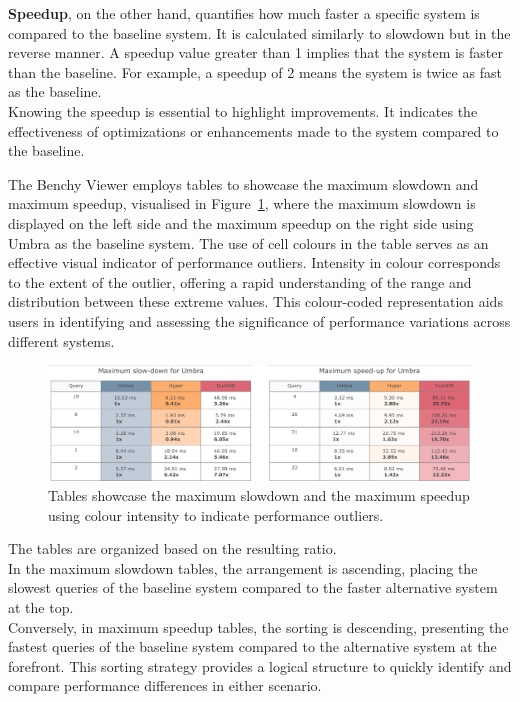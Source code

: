 \textbf{Speedup}, on the other hand, quantifies how much faster a specific system is compared to the baseline system. It is calculated similarly to slowdown but in the reverse manner. A speedup value greater than 1 implies that the system is faster than the baseline. For example, a speedup of 2 means the system is twice as fast as the baseline.\\
Knowing the speedup is essential to highlight improvements. It indicates the effectiveness of optimizations or enhancements made to the system compared to the baseline.

The Benchy Viewer employs tables to showcase the maximum slowdown and maximum speedup, visualised in Figure~\ref{fig:slowdown-speedup-chart}, where the maximum slowdown is displayed on the left side and the maximum speedup on the right side using Umbra as the baseline system. The use of cell colours in the table serves as an effective visual indicator of performance outliers. Intensity in colour corresponds to the extent of the outlier, offering a rapid understanding of the range and distribution between these extreme values. This colour-coded representation aids users in identifying and assessing the significance of performance variations across different systems.

\begin{figure}[h]
  \centering
  \includegraphics[width=1\linewidth]{figures/bsp-table-speedup-slowdown.png}
  \caption{Tables showcase the maximum slowdown and the maximum speedup using colour intensity to indicate performance outliers.}
  \label{fig:slowdown-speedup-chart}
\end{figure}

The tables are organized based on the resulting ratio.\\
In the maximum slowdown tables, the arrangement is ascending, placing the slowest queries of the baseline system compared to the faster alternative system at the top.\\
Conversely, in maximum speedup tables, the sorting is descending, presenting the fastest queries of the baseline system compared to the alternative system at the forefront. This sorting strategy provides a logical structure to quickly identify and compare performance differences in either scenario.

